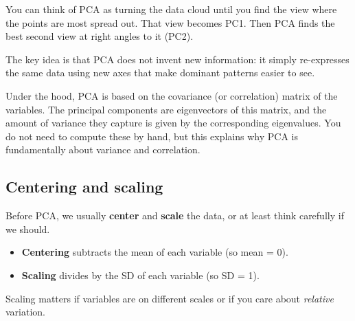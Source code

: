 \documentclass[
  letterpaper,
  8pt,
  a4paper]{book}
\providecommand{\tightlist}{%
  \setlength{\itemsep}{0pt}\setlength{\parskip}{0pt}}
\begin{document}
You can think of PCA as turning the data cloud until you find the view
where the points are most spread out. That view becomes PC1. Then PCA
finds the best second view at right angles to it (PC2).

The key idea is that PCA does not invent new information: it simply
re-expresses the same data using new axes that make dominant patterns
easier to see.

\begin{tcolorbox}[enhanced jigsaw, arc=.35mm, bottomrule=.15mm, bottomtitle=1mm, breakable, colback=white, colbacktitle=quarto-callout-note-color!10!white, colframe=quarto-callout-note-color-frame, coltitle=black, left=2mm, leftrule=.75mm, opacityback=0, opacitybacktitle=0.6, rightrule=.15mm, title=\textcolor{quarto-callout-note-color}{\faInfo}\hspace{0.5em}{Note}, titlerule=0mm, toprule=.15mm, toptitle=1mm]

Under the hood, PCA is based on the covariance (or correlation) matrix
of the variables. The principal components are eigenvectors of this
matrix, and the amount of variance they capture is given by the
corresponding eigenvalues. You do not need to compute these by hand, but
this explains why PCA is fundamentally about variance and correlation.

\end{tcolorbox}

\subsection*{Centering and scaling}\label{centering-and-scaling}

Before PCA, we usually \textbf{center} and \textbf{scale} the data, or
at least think carefully if we should.

\begin{itemize}
\tightlist
\item
  \textbf{Centering} subtracts the mean of each variable (so mean = 0).
\item
  \textbf{Scaling} divides by the SD of each variable (so SD = 1).
\end{itemize}

Scaling matters if variables are on different scales or if you care
about \emph{relative} variation.
\end{document}

